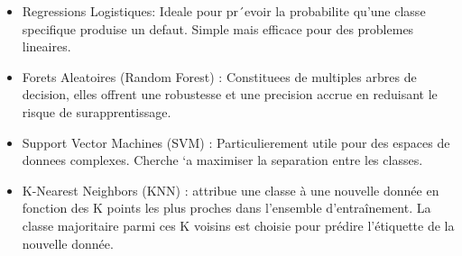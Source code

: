 \begin{itemize}
    \item Regressions Logistiques: Ideale pour pr´evoir la probabilite qu’une classe specifique produise un defaut. Simple mais efficace pour des problemes
lineaires.
    \item Forets Aleatoires (Random Forest) : Constituees de multiples arbres de decision, elles offrent une robustesse et une precision accrue en reduisant le risque de surapprentissage.
    \item Support Vector Machines (SVM) : Particulierement utile pour des espaces de donnees complexes. Cherche `a maximiser la separation entre les classes.
    \item K-Nearest Neighbors (KNN) : attribue une classe à une nouvelle donnée en fonction des K points les plus proches dans l’ensemble d’entraînement. La classe majoritaire parmi ces K voisins est choisie pour prédire l’étiquette de la nouvelle donnée.

\end{itemize}


